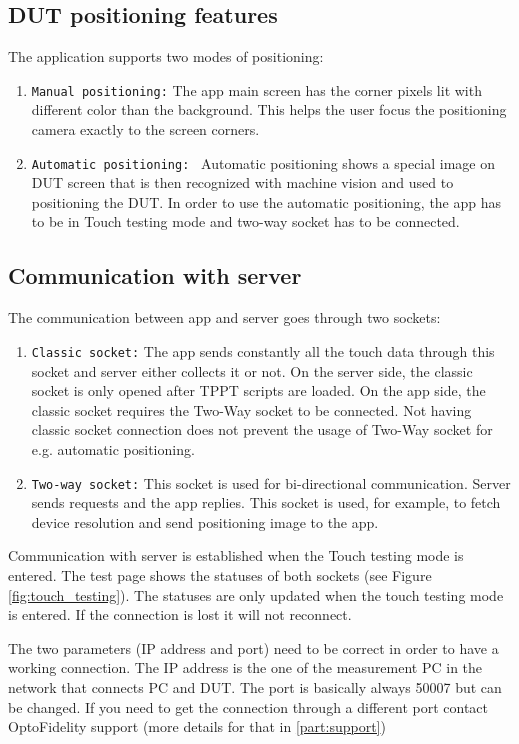 \subsection{DUT positioning features}
\label{subsec:dut_positioning_features}
The application supports two modes of positioning:
\begin{enumerate}
	\item \texttt{Manual positioning:} The app main screen has the corner pixels lit with different color than the background. This helps the user focus the positioning camera exactly to the screen corners.
	\item \texttt{Automatic positioning: } Automatic positioning shows a special image on DUT screen that is then recognized with machine vision and used to positioning the DUT. In order to use the automatic positioning, the app has to be in Touch testing mode and two-way socket has to be connected.
\end{enumerate}

\subsection{Communication with server}
\label{subsec:communication_with_server}
The communication between app and server goes through two sockets:
\begin{enumerate}
	\item \texttt{Classic socket:} The app sends constantly all the touch data through this socket and server either collects it or not. On the server side, the classic socket is only opened after TPPT scripts are loaded. On the app side, the classic socket requires the Two-Way socket to be connected. Not having classic socket connection does not prevent the usage of Two-Way socket for e.g. automatic positioning.
	\item \texttt{Two-way socket:} This socket is used for bi-directional communication. Server sends requests and the app replies. This socket is used, for example, to fetch device resolution and send positioning image to the app.
\end{enumerate}


Communication with server is established when the Touch testing mode is entered. The test page shows the statuses of both sockets (see Figure \ref{fig:touch_testing}). The statuses are only updated when the touch testing mode is entered. If the connection is lost it will not reconnect. 

The two parameters (IP address and port) need to be correct in order to have a working connection. The IP address is the one of the measurement PC in the network that connects PC and DUT. The port is basically always 50007 but can be changed. If you need to get the connection through a different port contact OptoFidelity support (more details for that in \ref{part:support})

